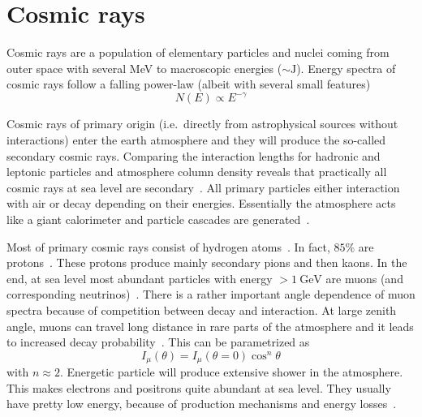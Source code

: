 \section{Cosmic rays}
Cosmic rays are a population of elementary particles and nuclei coming from outer space with several \si{\mega\eV} to macroscopic energies ($\sim\si{\joule}$). Energy spectra of cosmic rays follow a falling power-law (albeit with several small features)~\cite{PDG}~\cite{Gaisser}
\begin{equation*}
	N(E) \propto E^{-\gamma}
\end{equation*}

Cosmic rays of primary origin (i.e.~directly from astrophysical sources without interactions) enter the earth atmosphere and they will produce the so-called secondary cosmic rays. Comparing the interaction lengths for hadronic and leptonic particles and atmosphere column density reveals that practically all cosmic rays at sea level are secondary~\cite{grupen}. All primary particles either interaction with air or decay depending on their energies. Essentially the atmosphere acts like a giant calorimeter and particle cascades are generated~\cite{grupen}.

Most of primary cosmic rays consist of hydrogen atoms~\cite{Gaisser}. In fact, $85\%$ are protons~\cite{grupen}. These protons produce mainly secondary pions and then kaons. In the end, at sea level most abundant particles with energy $>\SI{1}{\giga\eV}$ are muons (and corresponding neutrinos)~\cite{PDG}. There is a rather important angle dependence of muon spectra because of competition between decay and interaction. At large zenith angle, muons can travel long distance in rare parts of the atmosphere and it leads to increased decay probability~\cite{grupen}. This can be parametrized as~\cite{grupen}
\begin{equation}
	I_\mu (\theta) = I_\mu (\theta = 0) \cos^n \theta
\end{equation}
with $n\approx 2$. Energetic particle will produce extensive shower in the atmosphere.	This makes electrons and positrons quite abundant at sea level. They usually have pretty low energy, because of production mechanisms and energy losses~\cite{grupen}.
